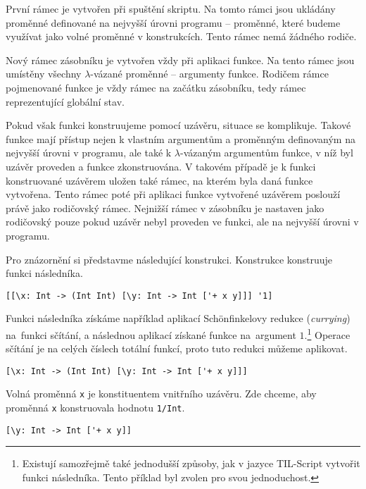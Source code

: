První rámec je vytvořen při spuštění skriptu. Na tomto rámci jsou ukládány proměnné definované
na nejvyšší úrovni programu -- proměnné, které budeme využívat jako volné proměnné v konstrukcích.
Tento rámec nemá žádného rodiče.

Nový rámec zásobníku je vytvořen vždy při aplikaci funkce. Na tento rámec jsou umístěny
všechny $\lambda$-vázané proměnné -- argumenty funkce. Rodičem rámce pojmenované funkce je vždy rámec
na začátku zásobníku, tedy rámec reprezentující globální stav.

Pokud však funkci konstruujeme pomocí uzávěru, situace se komplikuje. Takové funkce mají přístup
nejen k vlastním argumentům a proměnným definovaným na nejvyšší úrovni v programu, ale také
k $\lambda$-vázaným argumentům funkce, v níž byl uzávěr proveden a funkce zkonstruována. V takovém
případě je k funkci konstruované uzávěrem uložen také rámec, na kterém byla daná funkce vytvořena.
Tento rámec poté při aplikaci funkce vytvořené uzávěrem poslouží právě jako rodičovský rámec.
Nejnižší rámec v zásobníku je nastaven jako rodičovský pouze pokud uzávěr nebyl proveden ve funkci,
ale na nejvyšší úrovni v programu.

Pro znázornění si představme následující konstrukci. Konstrukce konstruuje funkci následníka.

\begin{lstlisting}[caption={Funkce následníka pomocí vnořených uzávěrů}]
[[\x: Int -> (Int Int) [\y: Int -> Int ['+ x y]]] '1]
\end{lstlisting}

Funkci následníka získáme například aplikací Sch{\"o}nfinkelovy redukce (\textit{currying})
na~funkci sčítání, a následnou aplikací získané funkce
na~argument $1$.\footnote{Existují samozřejmě také jednodušší způsoby, jak v jazyce TIL-Script
  vytvořit funkci následníka. Tento příklad byl zvolen pro svou jednoduchost.}
Operace sčítání je na celých číslech totální funkcí, proto tuto redukci můžeme aplikovat.

\begin{lstlisting}[caption={Vnější uzávěr}]
[\x: Int -> (Int Int) [\y: Int -> Int ['+ x y]]]
\end{lstlisting}

Volná proměnná \lstinline{x} je konstituentem vnitřního uzávěru. Zde chceme, aby proměnná
\lstinline{x} konstruovala hodnotu \lstinline{1/Int}.

\begin{lstlisting}[caption={Vnitřní uzávěr}]
[\y: Int -> Int ['+ x y]]
\end{lstlisting}


